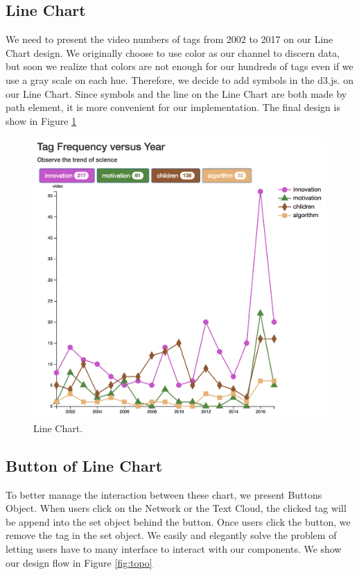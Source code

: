 \documentclass{report}
\numberwithin{figure}{section}
\begin{document}
\subsection{Line Chart}
\quad  We need to present the video numbers of tags from 2002 to 2017 on our Line Chart design. We originally choose to use color as our channel to discern data, but soon we realize that colors are not enough for our hundreds of tags even if we use a gray scale on each hue. Therefore, we decide to add symbols\cite{d3.symbol} in the d3.js. on our Line Chart. Since symbols and the line on the Line Chart are both made by path element, it is more convenient for our implementation. The final design is show in Figure \ref{fig:linechart}

\begin{figure}
\begin{center}
\includegraphics[scale=0.4]{linechart}
\caption{Line Chart.}
\label{fig:linechart}
\end{center}
\end{figure}



\subsection{Button of Line Chart}
\quad To better manage the interaction between these chart, we present Buttons Object. When users click on the Network or the Text Cloud, the clicked tag will be append into the set object behind the button. Once users click the button, we remove the tag in the set object. We easily and elegantly solve the problem of letting users have to many interface to interact with our components. We show our design flow in Figure \ref{fig:topo}
\end{document}

